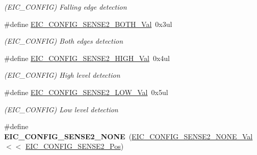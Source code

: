 \begin{DoxyCompactItemize}
\begin{DoxyCompactList}\small\item\em (E\+I\+C\+\_\+\+C\+O\+N\+F\+I\+G) Falling edge detection \end{DoxyCompactList}\item 
\hypertarget{group___s_a_m_l21___e_i_c_ga7809a27e221937b35d9e6b969a3771fb}{}\#define \hyperlink{group___s_a_m_l21___e_i_c_ga7809a27e221937b35d9e6b969a3771fb}{E\+I\+C\+\_\+\+C\+O\+N\+F\+I\+G\+\_\+\+S\+E\+N\+S\+E2\+\_\+\+B\+O\+T\+H\+\_\+\+Val}~0x3ul\label{group___s_a_m_l21___e_i_c_ga7809a27e221937b35d9e6b969a3771fb}

\begin{DoxyCompactList}\small\item\em (E\+I\+C\+\_\+\+C\+O\+N\+F\+I\+G) Both edges detection \end{DoxyCompactList}\item 
\hypertarget{group___s_a_m_l21___e_i_c_ga949642d01c96957d1e5f9279d3b48c2c}{}\#define \hyperlink{group___s_a_m_l21___e_i_c_ga949642d01c96957d1e5f9279d3b48c2c}{E\+I\+C\+\_\+\+C\+O\+N\+F\+I\+G\+\_\+\+S\+E\+N\+S\+E2\+\_\+\+H\+I\+G\+H\+\_\+\+Val}~0x4ul\label{group___s_a_m_l21___e_i_c_ga949642d01c96957d1e5f9279d3b48c2c}

\begin{DoxyCompactList}\small\item\em (E\+I\+C\+\_\+\+C\+O\+N\+F\+I\+G) High level detection \end{DoxyCompactList}\item 
\hypertarget{group___s_a_m_l21___e_i_c_ga475f78069ac4ecbb6c2115497fa686f0}{}\#define \hyperlink{group___s_a_m_l21___e_i_c_ga475f78069ac4ecbb6c2115497fa686f0}{E\+I\+C\+\_\+\+C\+O\+N\+F\+I\+G\+\_\+\+S\+E\+N\+S\+E2\+\_\+\+L\+O\+W\+\_\+\+Val}~0x5ul\label{group___s_a_m_l21___e_i_c_ga475f78069ac4ecbb6c2115497fa686f0}

\begin{DoxyCompactList}\small\item\em (E\+I\+C\+\_\+\+C\+O\+N\+F\+I\+G) Low level detection \end{DoxyCompactList}\item 
\hypertarget{group___s_a_m_l21___e_i_c_ga4a1c1d2feea55032d7ae9fc0734428dc}{}\#define {\bfseries E\+I\+C\+\_\+\+C\+O\+N\+F\+I\+G\+\_\+\+S\+E\+N\+S\+E2\+\_\+\+N\+O\+N\+E}~(\hyperlink{group___s_a_m_l21___e_i_c_ga89231a2e48fe64b47ec85f545280b7df}{E\+I\+C\+\_\+\+C\+O\+N\+F\+I\+G\+\_\+\+S\+E\+N\+S\+E2\+\_\+\+N\+O\+N\+E\+\_\+\+Val}    $<$$<$ \hyperlink{group___s_a_m_l21___e_i_c_gaf67e9a2938eae7c6f9f4d19c405e243f}{E\+I\+C\+\_\+\+C\+O\+N\+F\+I\+G\+\_\+\+S\+E\+N\+S\+E2\+\_\+\+Pos})\label{group___s_a_m_l21___e_i_c_ga4a1c1d2feea55032d7ae9fc0734428dc}


\end{DoxyCompactItemize}
